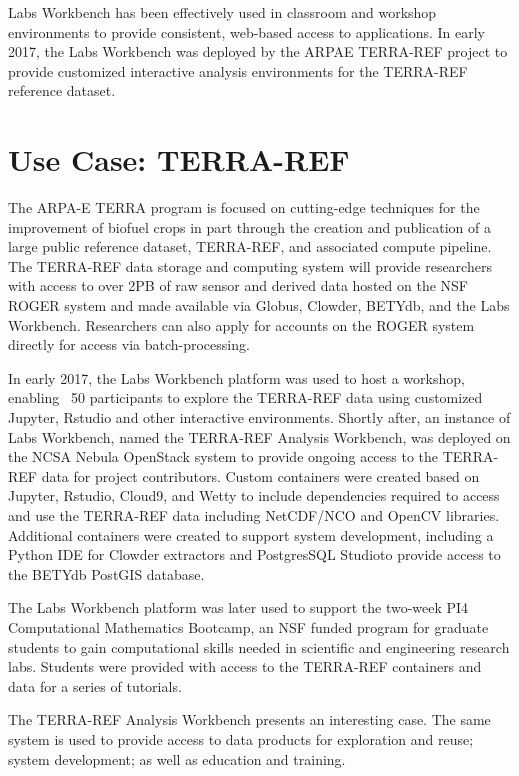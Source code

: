 \documentclass{sig-alternate}
\begin{document}
Labs Workbench has been effectively used in classroom and workshop environments to provide consistent, web-based access to applications. In early 2017, the Labs Workbench was deployed by the ARPAE TERRA-REF project to provide customized interactive analysis environments for the TERRA-REF reference dataset. 

\section{Use Case: TERRA-REF}

The ARPA-E TERRA program is focused on cutting-edge techniques for the improvement of biofuel crops in part through the creation and publication of a large public reference dataset, TERRA-REF, and associated compute pipeline. The TERRA-REF data storage and computing system will provide researchers with access to over 2PB of raw sensor and derived data hosted on the NSF ROGER system and made available via Globus, Clowder, BETYdb, and the Labs Workbench. Researchers can also apply for accounts on the ROGER system directly for access via batch-processing.

In early 2017, the Labs Workbench platform was used to host a workshop, enabling ~50 participants to explore the TERRA-REF data using customized Jupyter, Rstudio and other interactive environments. Shortly after, an instance of Labs Workbench, named the TERRA-REF Analysis Workbench, was deployed on the NCSA Nebula OpenStack system to provide ongoing access to the TERRA-REF data for project contributors. Custom containers were created based on Jupyter, Rstudio, Cloud9, and Wetty to include dependencies required to access and use the TERRA-REF data including NetCDF/NCO and OpenCV libraries.  Additional containers were created to support system development, including a Python IDE for Clowder extractors and PostgresSQL Studioto provide access to the BETYdb PostGIS database.

The Labs Workbench platform was later used to support the two-week PI4 Computational Mathematics Bootcamp, an NSF funded program for graduate students to gain computational skills needed in scientific and engineering research labs. Students were provided with access to the TERRA-REF containers and data for a series of tutorials. 

The TERRA-REF Analysis Workbench presents an interesting case. The same system is used to provide access to data products for exploration and reuse; system development; as well as education and training.
\end{document}
